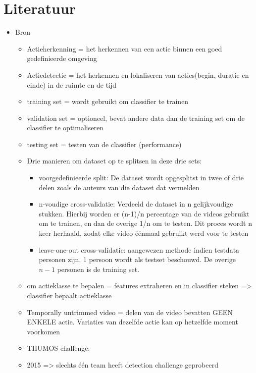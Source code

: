 \chapter{Literatuur}

\begin{itemize}
		\item Bron \cite{MinKang2016}
	\begin{itemize}
		\item Actieherkenning = het herkennen van een actie binnen een goed gedefinieerde omgeving 
		\item Actiedetectie = het herkennen en lokaliseren van acties(begin, duratie en einde) in de ruimte en de tijd
		\item training set = wordt gebruikt om classifier te trainen
		\item validation set = optioneel, bevat andere data dan de training set om de classifier te optimaliseren
		\item testing set = testen van de classifier (performance)
		\item Drie manieren om dataset op te splitsen in deze drie sets:
		\begin{itemize}
			\item voorgedefinieerde split: De dataset wordt opgesplitst  in twee of drie delen zoals de auteurs van die dataset dat vermelden
			\item n-voudige cross-validatie: Verdeeld de dataset in n gelijkvoudige stukken. Hierbij worden er (n-1)/n  percentage van de videos gebruikt om te trainen, en dan de overige 1/n om te testen. Dit proces wordt n keer herhaald, zodat elke video éénmaal gebruikt werd voor te testen
			\item leave-one-out cross-validatie: {\color{green}aangewezen methode indien testdata personen zijn.} 1 persoon wordt als testset beschouwd. De overige $n - 1$ personen is de training set.
		\end{itemize}
		
		
		\item  om actieklasse te bepalen = features extraheren en in classifier steken => classifier bepaalt actieklasse
		\item Temporally untrimmed video = delen van de video bevatten GEEN ENKELE actie. Variaties van dezelfde actie kan op hetzelfde moment voorkomen
		
		\item THUMOS challenge:
		\item 2015 => slechts één team heeft detection challenge geprobeerd
		

\end{itemize}
\end{itemize}
